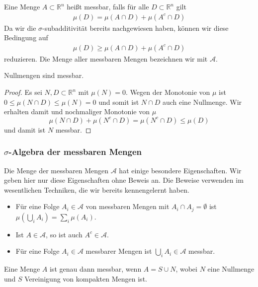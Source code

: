 \begin{Definition}
Eine Menge $A \subset \mathbb{R}^n$ heißt messbar, falls für alle $D \subset  \mathbb{R}^n$ gilt
\begin{align*}
\mu(D) =  \mu(A \cap D) + \mu(A^c \cap D)
\end{align*}
Da wir die $\sigma$-subadditivität bereits nachgewiesen haben, können wir diese Bedingung auf
\begin{align*}
\mu(D) \geq  \mu(A \cap D) + \mu(A^c \cap D)
\end{align*}
reduzieren. Die Menge aller messbaren Mengen bezeichnen wir mit $\mathcal{A}$.
\end{Definition}

\begin{Bemerkung}
Nullmengen sind messbar.
\end{Bemerkung}
\begin{proof}
Es sei $N, D \subset \mathbb{R}^n$ mit $\mu(N)= 0$. Wegen der Monotonie von $\mu$ ist $0 \leq \mu (N \cap D) \leq \mu(N) = 0$ und somit ist $N \cap D$ auch eine Nullmenge. Wir erhalten damit und nochmaliger Monotonie von $\mu$
$$ \mu(N \cap D) + \mu (N^c \cap D) =  \mu (N^c \cap D) \leq \mu(D) $$
und damit ist $N$ messbar.
\end{proof}



\subsubsection*{$\sigma$-Algebra der messbaren Mengen}
Die Menge der messbaren Mengen $\mathcal{A}$ hat einige besondere Eigenschaften. Wir geben hier nur diese Eigenschaften ohne Beweis an. Die Beweise verwenden im wesentlichen Techniken, die wir bereits kennengelernt haben.
\begin{itemize}
\item Für eine Folge $A_i \in \mathcal{A}$ von messbaren Mengen mit $A_i \cap A_j  =  \emptyset$ ist $\mu (\bigcup_i A_i ) = \sum_i \mu(A_i)$.
\item Ist $A \in \mathcal{A} $, so ist auch $A^c \in \mathcal{A} $.
\item Für eine Folge $A_i \in \mathcal{A}$ messbarer Mengen  ist $\bigcup_i A_i \in \mathcal{A}$ messbar.
\end{itemize}



\begin{Satz}
Eine Menge $A$ ist genau dann messbar, wenn $A = S \cup N$, wobei $N$ eine Nullmenge und $S$ Vereinigung von kompakten Mengen ist.
\end{Satz}


